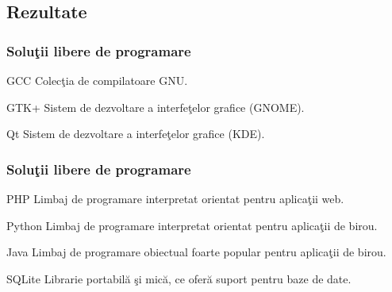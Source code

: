 \documentclass[compress]{beamer}
\begin{document}
\subsection{Rezultate}

\begin{frame}
\frametitle{Solu\c{t}ii libere de programare}

\begin{exampleblock}{GCC}
Colec\c{t}ia de compilatoare GNU.
\end{exampleblock}

\pause

\begin{exampleblock}{GTK+}
Sistem de dezvoltare a interfe\c{t}elor grafice (GNOME).
\end{exampleblock}

\pause

\begin{exampleblock}{Qt}
Sistem de dezvoltare a interfe\c{t}elor grafice (KDE).
\end{exampleblock}

\end{frame}


\begin{frame}
\frametitle{Solu\c{t}ii libere de programare}

\begin{exampleblock}{PHP}
Limbaj de programare interpretat orientat pentru aplica\c{t}ii web.
\end{exampleblock}

\pause

\begin{exampleblock}{Python}
Limbaj de programare interpretat orientat pentru aplica\c{t}ii de birou.
\end{exampleblock}

\pause

\begin{exampleblock}{Java}
Limbaj de programare obiectual foarte popular pentru aplica\c{t}ii de birou.
\end{exampleblock}

\pause

\begin{exampleblock}{SQLite}
Librarie portabil\u{a} \c{s}i mic\u{a}, ce ofer\u{a} suport pentru baze de date.
\end{exampleblock}

\end{frame}
\end{document}
